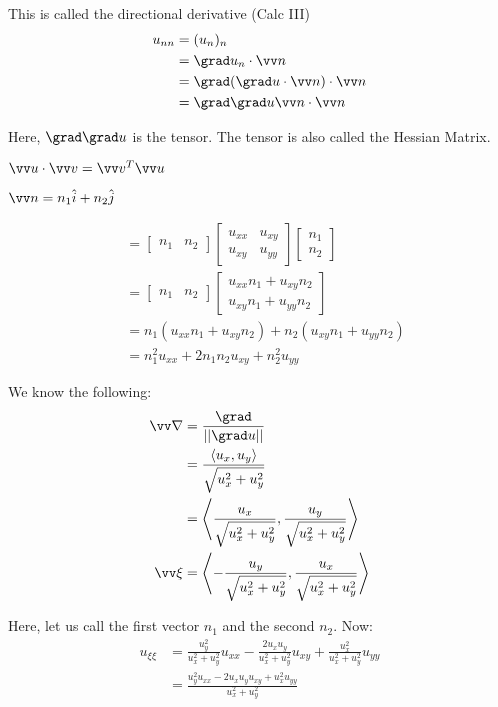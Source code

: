 This is called the directional derivative (Calc III)
%
\begin{align}
  u_{nn}
  & = (u_n)_n\\
  & = \grad u_n \cdot \vv n\\
  & = \grad(\grad u \cdot \vv n) \cdot \vv n\\
  & = \grad \grad u \vv n \cdot \vv n
\end{align}

Here, $\grad \grad u$ is the tensor. The tensor is also called the Hessian Matrix.

$\vv u \cdot \vv v = \vv v^T \vv u$

$\vv n = n_1 \hat i + n_2 \hat j$

%
\begin{align}
  & =
  \begin{bmatrix}
    n_1 & n_2
  \end{bmatrix}
  \begin{bmatrix}
    u_{xx} & u_{xy}\\
    u_{xy} & u_{yy}
  \end{bmatrix}
  \begin{bmatrix}
    n_1\\
    n_2
  \end{bmatrix}\\
  & =
  \begin{bmatrix}
    n_1 & n_2
  \end{bmatrix}
  \begin{bmatrix}
    u_{xx}n_1 + u_{xy} n_2\\
    u_{xy}n_1 + u_{yy} n_2
  \end{bmatrix}\\
  & =
    n_1 (u_{xx}n_1 + u_{xy} n_2) +
    n_2 (u_{xy}n_1 + u_{yy} n_2)\\
  & =
    n^2_1 u_{xx} + 2n_1 n_2 u_{xy} + n^2_2 u_{yy}
\end{align}

We know the following:
%
\begin{align}
  \vv \nabla
  & = \frac{\grad}{||\grad u||}\\
  & = \frac{\left<u_x, u_y\right>}{\sqrt{u^2_x + u^2_y}}\\
  & = \left<  \frac{u_x}{\sqrt{u^2_x + u^2_y}} , \frac{u_y}{\sqrt{u^2_x + u^2_y}} \right>\\
  \vv \xi & = \left<- \frac{u_y}{\sqrt{u^2_x + u^2_y}} , \frac{u_x}{\sqrt{u^2_x + u^2_y}} \right>
\end{align}

Here, let us call the first vector $n_1$ and the second $n_2$. Now:
%
\begin{align}
  u_{\xi \xi} & = \frac{u^2_y}{u^2_x + u^2_y} u_{xx} - \frac{2 u_x u_y}{u^2_x + u^2_y} u_{xy} + \frac{u^2_x}{u^2_x + u^2_y} u_{yy}\\
  & = \frac{u^2_y u_{xx} - 2u_x u_y u_{xy} + u^2_x u_{yy}}{u^2_x + u^2_y}
\end{align}

